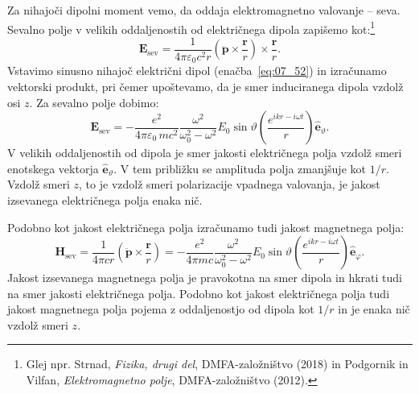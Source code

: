 Za nihajoči dipolni moment vemo, da oddaja elektromagnetno valovanje -- seva. 
Sevalno polje v velikih oddaljenostih od električnega dipola zapišemo 
kot:\footnote{Glej npr. Strnad, {\it Fizika, drugi del}, DMFA-založništvo (2018) in
Podgornik in Vilfan, {\it Elektromagnetno polje}, DMFA-založništvo (2012).}
\begin{equation}
\mathbf{E}_\mathrm{sev} = \frac{1}{4 \pi \varepsilon_0 c^2 r}
\left(\ddot{\mathbf{p}} \times \frac{\mathbf{r}}{r}\right)\times \frac{\mathbf{r}}{r}.
\label{eq:07_12}
\end{equation}
Vstavimo sinusno nihajoč električni dipol (enačba~\ref{eq:07_52})
in izračunamo vektorski produkt, pri čemer upoštevamo, da je smer induciranega
dipola vzdolž osi $z$. Za sevalno polje dobimo:
\begin{equation}
\mathbf{E}_\mathrm{sev} = -
\frac{e^2}{4 \pi \varepsilon_0\,m c^2}\frac{\omega^2}{\omega_0^2-\omega^2}E_0
\sin \vartheta \left(\frac{e^{ikr - i\omega t}}{r}\right) \hat{\mathbf{e}}_\vartheta.
\label{eq:dipolE}
\end{equation}
V velikih oddaljenostih od dipola je smer jakosti električnega polja vzdolž smeri enotskega
vektorja $\hat{\mathbf{e}}_\vartheta$. V tem približku se amplituda polja zmanjšuje 
kot $1/r$. Vzdolž smeri $z$, to je vzdolž smeri polarizacije vpadnega valovanja, 
je jakost izsevanega električnega polja enaka nič.

Podobno kot jakost električnega polja izračunamo tudi jakost magnetnega polja:
\begin{equation}
\mathbf{H}_\mathrm{sev} = \frac{1}{4 \pi c r}
\left(\ddot{\mathbf{p}} \times \frac{\mathbf{r}}{r}\right) = - \frac{e^2}{4 \pi m c}
\frac{\omega^2}{\omega_0^2-\omega^2}E_0\sin \vartheta
\left(\frac{e^{ikr - i\omega t}}{r}\right) \hat{\mathbf{e}}_\varphi.
\label{eq:dipolH}
\end{equation}
Jakost izsevanega magnetnega polja je pravokotna na smer dipola in 
hkrati tudi na smer jakosti električnega polja. Podobno kot jakost
električnega polja tudi jakost magnetnega polja pojema z oddaljenostjo
od dipola kot $1/r$ in je enaka nič vzdolž smeri $z$.

